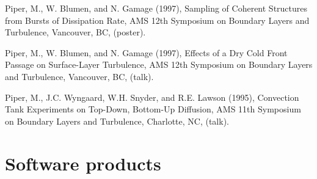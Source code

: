 \documentclass[letterpaper]{resume}
\begin{document}
\begin{enumerate}[{[}1{]}]
  \item Piper, M., W. Blumen, and N. Gamage (1997), Sampling of
    Coherent Structures from Bursts of Dissipation Rate, AMS 12th
    Symposium on Boundary Layers and Turbulence, Vancouver, BC,
    (poster).

  \item Piper, M., W. Blumen, and N. Gamage (1997), Effects of a Dry
    Cold Front Passage on Surface-Layer Turbulence, AMS 12th Symposium
    on Boundary Layers and Turbulence, Vancouver, BC, (talk).

  \item Piper, M., J.C. Wyngaard, W.H. Snyder, and R.E. Lawson (1995),
    Convection Tank Experiments on Top-Down, Bottom-Up Diffusion, AMS
    11th Symposium on Boundary Layers and Turbulence, Charlotte, NC,
    (talk).

\end{enumerate}


\section{Software products}
\vspace{0.5em}
\end{document}
